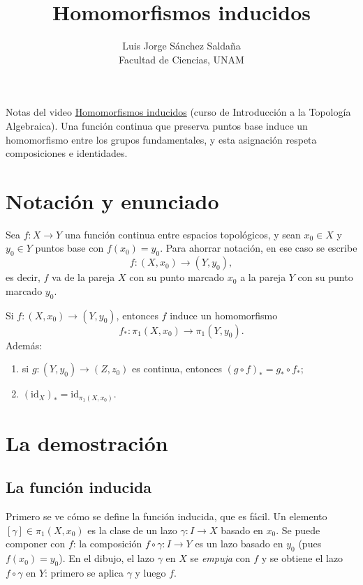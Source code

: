 \documentclass[11pt]{article}
\title{Homomorfismos inducidos}
\author{Luis Jorge Sánchez Saldaña\\[2pt]\small Facultad de Ciencias, UNAM}
\date{}
\begin{document}
\maketitle

\noindent\small Notas del video
\href{https://www.youtube.com/watch?v=jBuvlWhNWkg}{\guillemotleft{}Homomorfismos inducidos\guillemotright{}}
(curso de Introducción a la Topología Algebraica). Una función continua que preserva puntos base induce un homomorfismo entre los grupos fundamentales, y esta asignación respeta composiciones e identidades.
\normalsize

\section*{Notación y enunciado}

Sea $f\colon X\to Y$ una función continua entre espacios topológicos, y sean $x_0\in X$ y $y_0\in Y$ puntos base con $f(x_0)=y_0$. Para ahorrar notación, en ese caso se escribe
\[
  f\colon (X,x_0)\to(Y,y_0),
\]
es decir, $f$ va de la pareja $X$ con su punto marcado $x_0$ a la pareja $Y$ con su punto marcado $y_0$.

\begin{teo}\label{teo:inducido}
Si $f\colon (X,x_0)\to(Y,y_0)$, entonces $f$ induce un homomorfismo
\[
  f_*\colon \pi_1(X,x_0)\to\pi_1(Y,y_0).
\]
Además:
\begin{enumerate}
  \item si $g\colon (Y,y_0)\to(Z,z_0)$ es continua, entonces $(g\circ f)_*=g_*\circ f_*$;
  \item $(\mathrm{id}_X)_*=\mathrm{id}_{\pi_1(X,x_0)}$.
\end{enumerate}
\end{teo}

\section*{La demostración}

\subsection*{La función inducida}

Primero se ve cómo se define la función inducida, que es fácil. Un elemento $[\gamma]\in\pi_1(X,x_0)$ es la clase de un lazo $\gamma\colon I\to X$ basado en $x_0$. Se puede componer con $f$: la composición $f\circ\gamma\colon I\to Y$ es un lazo basado en $y_0$ (pues $f(x_0)=y_0$). En el dibujo, el lazo $\gamma$ en $X$ se \emph{empuja} con $f$ y se obtiene el lazo $f\circ\gamma$ en $Y$: primero se aplica $\gamma$ y luego $f$.
\end{document}
